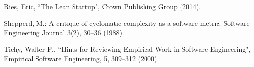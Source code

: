 \documentclass{svjour3}                     %
\begin{document}
\begin{thebibliography}{}

 Ries, Eric, ``The Lean Startup", Crown Publishing Group (2014).

 Shepperd, M.: A critique of cyclomatic complexity as a software metric. Software Engineering Journal 3(2), 30–36 (1988)

 Tichy, Walter F., ``Hints for Reviewing Empirical Work in Software Engineering", Empirical Software Engineering, 5, 309--312 (2000).

\end{thebibliography}
\end{document}
